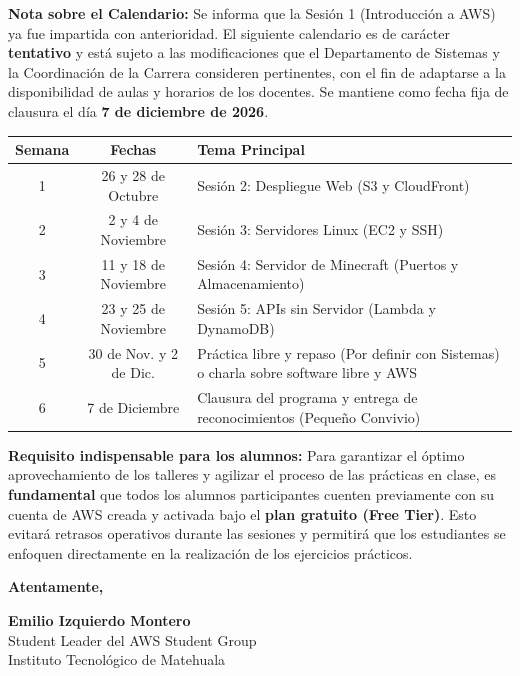 \documentclass[12pt]{article}
\begin{document}
\vspace{0.5cm}
\textbf{Nota sobre el Calendario:} Se informa que la Sesión 1 (Introducción a AWS) ya fue impartida con anterioridad. El siguiente calendario es de carácter \textbf{tentativo} y está sujeto a las modificaciones que el Departamento de Sistemas y la Coordinación de la Carrera consideren pertinentes, con el fin de adaptarse a la disponibilidad de aulas y horarios de los docentes. Se mantiene como fecha fija de clausura el día \textbf{7 de diciembre de 2026}.
\vspace{0.3cm}
\begin{center}
\begin{tabularx}{\textwidth}{|c|c|X|}
\hline
\textbf{Semana} & \textbf{Fechas} & \textbf{Tema Principal} \\
\hline
1 & 26 y 28 de Octubre & Sesión 2: Despliegue Web (S3 y CloudFront) \\
\hline
2 & 2 y 4 de Noviembre & Sesión 3: Servidores Linux (EC2 y SSH) \\
\hline
3 & 11 y 18 de Noviembre & Sesión 4: Servidor de Minecraft (Puertos y Almacenamiento) \\
\hline
4 & 23 y 25 de Noviembre & Sesión 5: APIs sin Servidor (Lambda y DynamoDB) \\
\hline
5 & 30 de Nov. y 2 de Dic. & Práctica libre y repaso (Por definir con Sistemas) o charla sobre software libre y AWS \\
\hline
6 & 7 de Diciembre & Clausura del programa y entrega de reconocimientos (Pequeño Convivio) \\
\hline
\end{tabularx}
\end{center}
\vspace{0.5cm}
\textbf{Requisito indispensable para los alumnos:} Para garantizar el óptimo aprovechamiento de los talleres y agilizar el proceso de las prácticas en clase, es \textbf{fundamental} que todos los alumnos participantes cuenten previamente con su cuenta de AWS creada y activada bajo el \textbf{plan gratuito (Free Tier)}. Esto evitará retrasos operativos durante las sesiones y permitirá que los estudiantes se enfoquen directamente en la realización de los ejercicios prácticos.

\vspace{1.5cm}

\begin{flushright}
\textbf{Atentamente,}

\vspace{1.5cm}

\textbf{Emilio Izquierdo Montero} \\
Student Leader del AWS Student Group \\
Instituto Tecnológico de Matehuala
\end{flushright}
\end{document}
